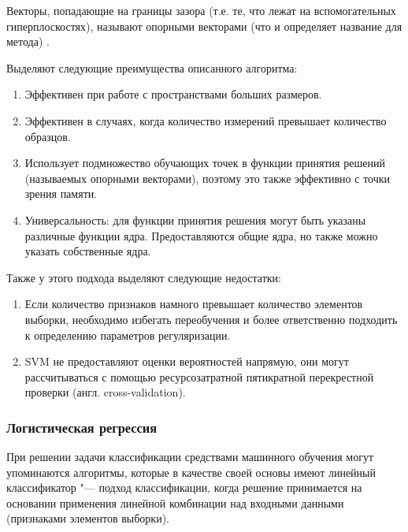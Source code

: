 \documentclass[bachelor, och, coursework]{SCWorks}
\begin{document}
            Векторы, попадающие на границы зазора (т.е. те, что лежат на
            вспомогательных гиперплоскостях), называют опорными векторами (что и
            определяет название для метода) \cite{svm}.

            Выделяют следующие преимущества описанного алгоритма:

            \begin{enumerate}
                \item Эффективен при работе с пространствами больших размеров.
                \item Эффективен в случаях, когда количество измерений превышает
                количество образцов.
                \item Использует подмножество обучающих точек в функции принятия
                решений (называемых опорными векторами), поэтому это также
                эффективно с точки зрения памяти.
                \item Универсальность: для функции принятия решения могут быть
                указаны различные функции ядра. Предоставляются общие ядра, но
                также можно указать собственные ядра.
            \end{enumerate}
            
            Также у этого подхода выделяют следующие недостатки:

            \begin{enumerate}
                \item Если количество признаков намного превышает количество
                элементов выборки, необходимо избегать переобучения и более
                ответственно подходить к определению параметров регуляризации.
                \item SVM не предоставляют оценки вероятностей напрямую, они
                могут рассчитываться с помощью ресурсозатратной пятикратной
                перекрестной проверки (англ. cross-validation).
            \end{enumerate}

        \subsubsection{Логистическая регрессия}

            При решении задачи классификации средствами машинного обучения могут
            упоминаются алгоритмы, которые в качестве своей основы имеют
            линейный классификатор "--- подход классификации, когда решение
            принимается на основании применения линейной комбинации над входными
            данными (признаками элементов выборки).
\end{document}
